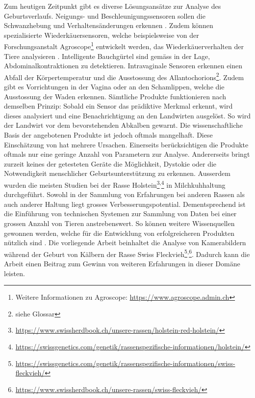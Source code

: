 Zum heutigen Zeitpunkt gibt es diverse Lösungsansätze zur Analyse des Geburtsverlaufs. Neigungs- und Beschleunigungssensoren sollen die Schwanzhebung und Verhaltensänderungen erkennen \citep[S. 6]{Saint-Dizier2015}. Zudem können spezialisierte Wiederkäuersensoren, welche beispielsweise von der Forschungsanstalt Agroscope\footnote{Weitere Informationen zu Agroscope: \url{https://www.agroscope.admin.ch}} entwickelt werden, das Wiederkäuerverhalten der Tiere analysieren \citep[S. 2]{Pahl2014}. Intelligente Bauchgürtel sind gemäss \citep[S. 6]{Saint-Dizier2015} in der Lage, \gls{Abdominal}kontraktionen zu detektieren. Intravaginale Sensoren erkennen einen Abfall der Körpertemperatur und die Ausstossung des \gls{Allantochorions}\footnote{siehe Glossar}. Zudem gibt es Vorrichtungen in der Vagina oder an den Schamlippen, welche die Ausstossung der Waden erkennen. Sämtliche Produkte funktionieren nach demselben Prinzip: Sobald ein Sensor das prädiktive Merkmal erkennt, wird dieses analysiert und eine Benachrichtigung an den Landwirten ausgelöst. So wird der Landwirt vor dem bevorstehenden Abkalben gewarnt. Die wissenschaftliche  Basis der angebotenen Produkte ist  jedoch oftmals mangelhaft. Diese Einschätzung von \citep[S. 6]{Saint-Dizier2015} hat mehrere Ursachen. Einerseits berücksichtigen die Produkte oftmals nur eine geringe Anzahl von Parametern zur Analyse. Andererseits bringt zurzeit keines der getesteten Geräte die Möglichkeit, Dystokie oder die Notwendigkeit menschlicher Geburtsunterstützung zu erkennen. Ausserdem wurden die meisten Studien bei der Rasse Holstein\footnote{ \url{https://www.swissherdbook.ch/unsere-rassen/holstein-red-holstein/}}\textsuperscript{,}\footnote{\url{https://swissgenetics.com/genetik/rassenspezifische-informationen/holstein/}} in Milchkuhhaltung durchgeführt. Sowohl in der Sammlung von Erfahrungen bei anderen Rassen als auch anderer Haltung liegt grosses Verbesserungspotential. Dementsprechend ist die Einführung von technischen Systemen zur Sammlung von Daten bei einer grossen Anzahl von Tieren anstrebenswert. So können weitere Wissenquellen gewonnen werden, welche für die Entwicklung von erfolgreicheren Produkten nützlich sind \citep[S. 6]{Saint-Dizier2015}. Die vorliegende Arbeit beinhaltet die Analyse von Kamerabildern während der Geburt von Kälbern der Rasse Swiss Fleckvieh\footnote{\url{https://swissgenetics.com/genetik/rassenspezifische-informationen/swiss-fleckvieh/}}\textsuperscript{,}\footnote{\url{https://www.swissherdbook.ch/unsere-rassen/swiss-fleckvieh/}}. Dadurch kann die Arbeit einen Beitrag zum Gewinn von weiteren Erfahrungen in dieser Domäne leisten.


